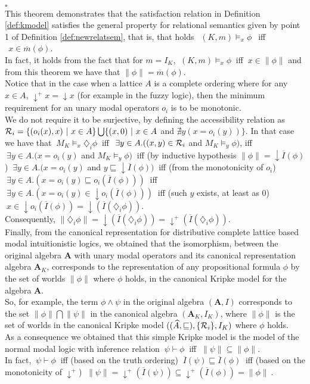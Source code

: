 \documentclass[10pt,twocolumn]{article}
\begin{document}
\\ $\square$\\
 This theorem demonstrates that the satisfaction relation in
Definition \ref{def:kmodel} satisfies the general property for
relational semantics given by point 1 of Definition
\ref{def:newrelatsem}, that is, that holds $~~(K,m)
\models_{x}\phi~~$ iff  $~~x \in \overline{m}(\phi)$.\\ In fact, it
holds from the fact that for $m = I_K$, $~(K,m) \models_{x}\phi~$
iff $~x \in \| \phi \|$ and  from this theorem we have that $ \|
\phi \| =
\overline{m}(\phi)$.\\
 Notice
that in the case when a lattice $A$ is a complete ordering where for
any $x\in A$, $\downarrow^+x = \downarrow x $ (for example in the
fuzzy logic), then the minimum requirement for an unary modal
operators $o_i$ is to be monotonic.\\ We do not require it to be
surjective, by defining the accessibility relation as $\mathcal{R}_i
=\{(o_i(x),x)~|~x \in A\} \bigcup \{(x,0)~|~x \in A$ and $\nexists
y(x = o_i(y))\}$. In that case we have that $~M_K \models_x
\diamondsuit_i \phi~$ iff $~\exists y \in A.((x,y) \in \mathcal{R}_i$ and
$M_K \models_y  \phi)$, iff $~\exists y \in A.( x = o_i(y)$ and $M_K
\models_y  \phi)~$ iff (by inductive hypothesis $\|\phi\|
=\downarrow\overline{I}(\phi)$) $~\exists y \in A.(x = o_i(y)$ and
$y \sqsubseteq \downarrow \overline{I}(\phi))~$   iff (from the
monotonicity of $o_i$) $~\exists y \in A.(x = o_i(y) \sqsubseteq
o_i(\overline{I}(\phi))) ~$ iff $~\exists y \in A.(x = o_i(y) \in
\downarrow o_i(\overline{I}(\phi)))~$ iff (such $y$ exists, at least
as $0$) $~x \in \downarrow o_i(\overline{I}(\phi)) = \downarrow
(\overline{I}(\diamondsuit_i \phi))$.\\ Consequently,
$\|\diamondsuit_i
\phi \| = \downarrow (\overline{I}(\diamondsuit_i \phi)) = \downarrow^+ (\overline{I}(\diamondsuit_i \phi))$.\\
 Finally, from the canonical representation for distributive complete lattice based modal intuitionistic logics, we obtained that the
isomorphism, between the original  algebra $\textbf{A}$ with unary
modal operators and its canonical representation algebra
$\textbf{A}_K$, corresponds to the representation of  any
propositional formula $\phi$ by the set of worlds $\| \phi \|$ where
$\phi$ holds, in the canonical Kripke
model for the algebra $\textbf{A}$.\\
 So, for example, the term $\phi \wedge
\psi$ in the original algebra $(\textbf{A},I)$ corresponds to the
set $\| \phi \| \bigcap \| \psi \|$ in the canonical algebra
$(\textbf{A}_K, I_K)$, where $\| \phi \|$ is the set of worlds in
the canonical Kripke model  $( (\widehat{A}, \sqsubseteq),
\{\mathcal{R}_i\}, I_K )$  where $\phi$ holds.\\
As a consequence we obtained that this simple Kripke model is the
model of the normal modal logic with inference relation $~\psi
\vdash \phi~$ iff $~\|\psi\| \subseteq \|\phi\|$.\\ In fact, $~\psi
\vdash \phi~$ iff (based on the truth ordering) $~\overline{I}(\psi)
\sqsubseteq \overline{I}(\phi)~$ iff (based on the monotonicity of
$\downarrow^+$) $~\|\psi\| = \downarrow^+(\overline{I}(\psi))
\subseteq \downarrow^+ (\overline{I}(\phi)) = \|\phi\|~$.\\
\end{document}
